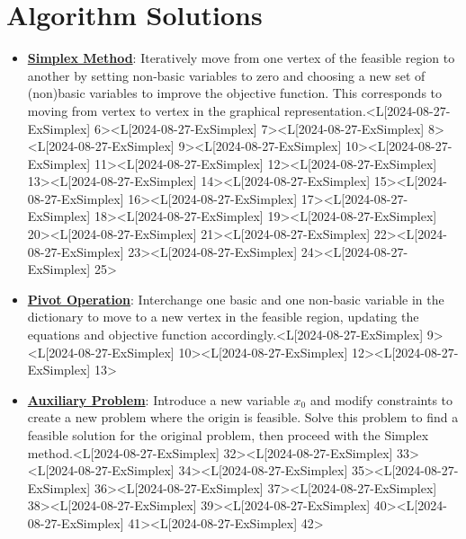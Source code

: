 \documentclass{article}%
\begin{document}
%
\section{Algorithm Solutions}%
\label{sec:AlgorithmSolutions}%
\begin{itemize}[[leftmargin=*]]%
\item \href{https://www.math.purdue.edu/~yipn/421/2024-08-27-ExSimplex.pdf#page=6}{\textbf{Simplex Method}}: Iteratively move from one vertex of the feasible region to another by setting non-basic variables to zero and choosing a new set of (non)basic variables to improve the objective function. This corresponds to moving from vertex to vertex in the graphical representation.<L[2024-08-27-ExSimplex] 6><L[2024-08-27-ExSimplex] 7><L[2024-08-27-ExSimplex] 8><L[2024-08-27-ExSimplex] 9><L[2024-08-27-ExSimplex] 10><L[2024-08-27-ExSimplex] 11><L[2024-08-27-ExSimplex] 12><L[2024-08-27-ExSimplex] 13><L[2024-08-27-ExSimplex] 14><L[2024-08-27-ExSimplex] 15><L[2024-08-27-ExSimplex] 16><L[2024-08-27-ExSimplex] 17><L[2024-08-27-ExSimplex] 18><L[2024-08-27-ExSimplex] 19><L[2024-08-27-ExSimplex] 20><L[2024-08-27-ExSimplex] 21><L[2024-08-27-ExSimplex] 22><L[2024-08-27-ExSimplex] 23><L[2024-08-27-ExSimplex] 24><L[2024-08-27-ExSimplex] 25>%
\item \href{https://www.math.purdue.edu/~yipn/421/2024-08-27-ExSimplex.pdf#page=9}{\textbf{Pivot Operation}}: Interchange one basic and one non-basic variable in the dictionary to move to a new vertex in the feasible region, updating the equations and objective function accordingly.<L[2024-08-27-ExSimplex] 9><L[2024-08-27-ExSimplex] 10><L[2024-08-27-ExSimplex] 12><L[2024-08-27-ExSimplex] 13>%
\item \href{https://www.math.purdue.edu/~yipn/421/2024-08-27-ExSimplex.pdf#page=32}{\textbf{Auxiliary Problem}}: Introduce a new variable $x_0$ and modify constraints to create a new problem where the origin is feasible. Solve this problem to find a feasible solution for the original problem, then proceed with the Simplex method.<L[2024-08-27-ExSimplex] 32><L[2024-08-27-ExSimplex] 33><L[2024-08-27-ExSimplex] 34><L[2024-08-27-ExSimplex] 35><L[2024-08-27-ExSimplex] 36><L[2024-08-27-ExSimplex] 37><L[2024-08-27-ExSimplex] 38><L[2024-08-27-ExSimplex] 39><L[2024-08-27-ExSimplex] 40><L[2024-08-27-ExSimplex] 41><L[2024-08-27-ExSimplex] 42>%
\end{itemize}%
\newpage

%
\end{document}
